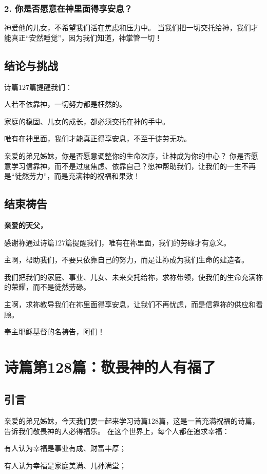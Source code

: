 \documentclass[a4paper, 12pt]{article}
\begin{document}
\subsubsection*{2. 你是否愿意在神里面得享安息？}
神爱他的儿女，不希望我们活在焦虑和压力中。
当我们把一切交托给神，我们才能真正“安然睡觉”，因为我们知道，神掌管一切！
\subsection*{结论与挑战}
诗篇127篇提醒我们：

人若不依靠神，一切努力都是枉然的。

家庭的稳固、儿女的成长，都必须交托在神的手中。

唯有在神里面，我们才能真正得享安息，不至于徒劳无功。

亲爱的弟兄姊妹，你是否愿意调整你的生命次序，让神成为你的中心？ 你是否愿意学习信靠神，而不是过度焦虑、依靠自己？愿神帮助我们，让我们的一生不再是“徒然劳力”，而是充满神的祝福和果效！

\subsection*{结束祷告}
\textbf{亲爱的天父，}

感谢祢通过诗篇127篇提醒我们，唯有在祢里面，我们的劳碌才有意义。

主啊，帮助我们，不要只依靠自己的努力，而是让祢成为我们生命的建造者。

我们把我们的家庭、事业、儿女、未来交托给祢，求祢带领，使我们的生命充满祢的荣耀，而不是徒然劳碌。

主啊，求祢教导我们在祢里面得享安息，让我们不再忧虑，而是信靠祢的供应和看顾。

奉主耶稣基督的名祷告，阿们！
\newpage
\section{诗篇第128篇：敬畏神的人有福了}
\subsection*{引言}
亲爱的弟兄姊妹，今天我们要一起来学习诗篇128篇，这是一首充满祝福的诗篇，告诉我们敬畏神的人必得福乐。
在这个世界上，每个人都在追求幸福：

有人认为幸福是事业有成、财富丰厚；

有人认为幸福是家庭美满、儿孙满堂；
\end{document}
